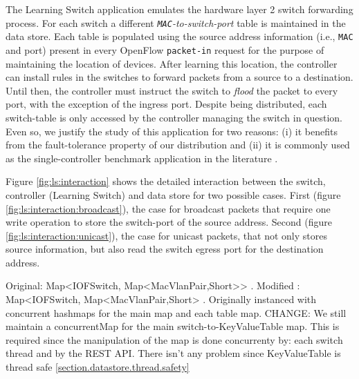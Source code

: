 The Learning Switch application emulates the hardware layer 2 switch
forwarding process. For each switch a different \emph{\texttt{MAC}-to-switch-port}
table is maintained in the data store. Each table is populated using
the source address information (i.e., \texttt{MAC} and port)  present in every OpenFlow
\texttt{packet-in} request for the purpose of maintaining the location
of devices. After learning this location, the controller can install
rules in the switches to forward packets from a source to a
destination. Until then, the controller must instruct the switch to
\emph{flood} the packet to every port, with the exception of
  the ingress port. Despite being distributed, each switch-table is
  only accessed by the controller managing the switch in
  question. Even so, we justify the study  of this application for two
  reasons: (i) it benefits from the fault-tolerance property of
  our distribution and (ii) it is commonly used as the
  single-controller benchmark application in the literature \cite{Tootoonchian:2012uia}. 


Figure \ref{fig:ls:interaction}  shows the detailed interaction between the
switch, controller (Learning Switch) and data store for two possible
cases. First (figure \ref{fig:ls:interaction:broadcast}), the case for broadcast packets that require
one write operation to store the switch-port  of the
source address. Second (figure \ref{fig:ls:interaction:unicast}),   the case for unicast
packets, that not only stores source information, but also read the
switch egress port for the destination address.  



Original:  Map<IOFSwitch, Map<MacVlanPair,Short>> . Modified : Map<IOFSwitch, Map<MacVlanPair,Short> . Originally instanced with concurrent hashmaps for the main map and each table map. 
CHANGE: We still maintain a concurrentMap for the main switch-to-KeyValueTable map. This is required since the manipulation of the map is done concurrenty by: each switch thread and  by the REST API.
There isn't any problem since KeyValueTable is  thread safe \ref{section.datastore.thread.safety}

